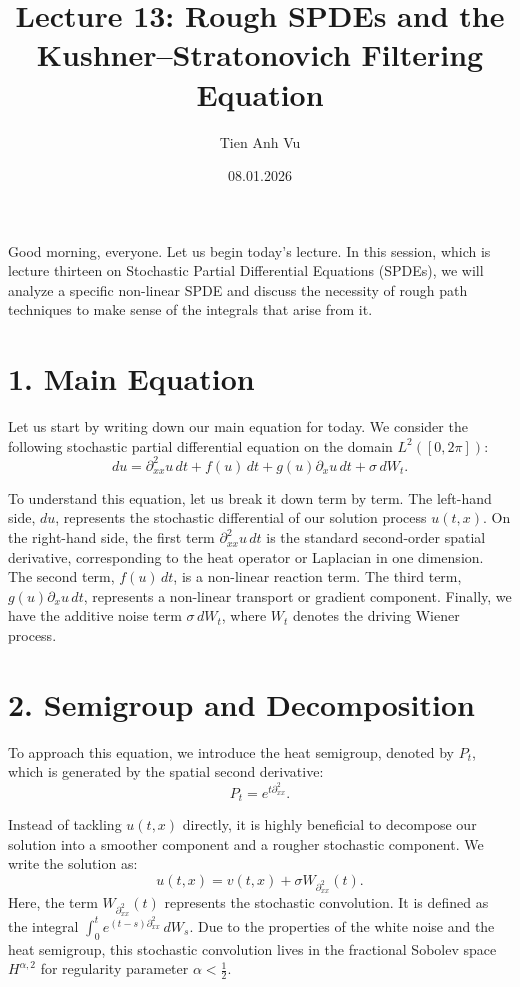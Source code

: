 \documentclass[11pt]{article}
\title{Lecture 13: Rough SPDEs and the Kushner--Stratonovich Filtering Equation}
\date{08.01.2026}
\author{Tien Anh Vu}
\theoremstyle{definition}
\theoremstyle{remark}
\begin{document}
\maketitle

Good morning, everyone. Let us begin today's lecture. In this session, which is lecture thirteen on Stochastic Partial Differential Equations (SPDEs), we will analyze a specific non-linear SPDE and discuss the necessity of rough path techniques to make sense of the integrals that arise from it.

\section*{1. Main Equation}
Let us start by writing down our main equation for today. We consider the following stochastic partial differential equation on the domain $L^2([0,2\pi])$:
\[
du=\partial_{xx}^{2}u\,dt+f(u)\,dt+g(u)\partial_xu\,dt+\sigma\,dW_t.
\]

To understand this equation, let us break it down term by term. The left-hand side, $du$, represents the stochastic differential of our solution process $u(t,x)$. On the right-hand side, the first term $\partial_{xx}^{2}u\,dt$ is the standard second-order spatial derivative, corresponding to the heat operator or Laplacian in one dimension. The second term, $f(u)\,dt$, is a non-linear reaction term. The third term, $g(u)\partial_xu\,dt$, represents a non-linear transport or gradient component. Finally, we have the additive noise term $\sigma\,dW_t$, where $W_t$ denotes the driving Wiener process.

\section*{2. Semigroup and Decomposition}
To approach this equation, we introduce the heat semigroup, denoted by $P_t$, which is generated by the spatial second derivative:
\[
P_t=e^{t\partial_{xx}^{2}}.
\]

Instead of tackling $u(t,x)$ directly, it is highly beneficial to decompose our solution into a smoother component and a rougher stochastic component. We write the solution as:
\[
u(t,x)=v(t,x)+\sigma W_{\partial_{xx}^{2}}(t).
\]
Here, the term $W_{\partial_{xx}^{2}}(t)$ represents the stochastic convolution. It is defined as the integral $\int_0^t e^{(t-s)\partial_{xx}^{2}}\,dW_s$. Due to the properties of the white noise and the heat semigroup, this stochastic convolution lives in the fractional Sobolev space $H^{\alpha,2}$ for regularity parameter $\alpha<\frac{1}{2}$.
\end{document}
